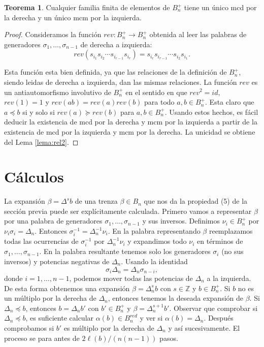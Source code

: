 \documentclass[12pt]{book}
\theoremstyle{definition}
\newtheorem{teor}{Teorema}[section]
\begin{document}
\begin{teor}
Cualquier familia finita de elementos de $B_n^+$ tiene un único mcd por la derecha y un único mcm por la izquierda.
\end{teor}
\begin{proof} Consideramos la función $rev: B_n^+\rightarrow B_n^+$ obtenida al leer las palabras de generadores $\sigma_1,\ldots, \sigma_{n-1}$ de derecha a izquierda:
$$rev(s_{i_1}s_{i_2}\cdots s_{i_{r-1}}s_{i_r})=s_{i_r}s_{i_{r-1}}\cdots s_{i_{2}}s_{i_1}.$$

Esta función esta bien definida, ya que las relaciones de la definición de $B_n^+$, siendo leidas de derecha a izquierda, dan las mismas relaciones. La función $rev$ es un antiautomorfismo involutivo de $B_n^+$ en el sentido en que $rev^2=id$, $rev(1)=1$ y $rev(ab)=rev(a)rev(b)$ para todo $a,b\in B_n^+$. Esta claro que $a\preceq b$ si y solo si $rev(a)\succeq rev(b)$ para $a,b\in B_n^+$. Usando estos hechos, es fácil deducir la existencia de mcd por la derecha y mcm por la izquierda a partir de la existencia de mcd por la izquierda y mcm por la derecha. La unicidad se obtiene del Lema \ref{lema:rel2}.
\end{proof}

\section{Cálculos}

La expansión $\beta=\Delta^sb$ de una trenza $\beta\in B_n$ que nos da la propiedad (5) de la sección previa puede ser explícitamente calculada. Primero vamos a representar $\beta$ por una palabra de generadores $\sigma_1,\ldots,\sigma_{n-1}$ y sus inversos. Definimos $\nu_i\in B_n^+$ por $\nu_i\sigma_i=\Delta_n$. Entonces $\sigma_i^{-1}=\Delta_n^{-1}\nu_i$. En la palabra representando $\beta$ reemplazamos todas las ocurrencias de $\sigma_i^{-1}$ por $\Delta_n^{-1}\nu_i$ y expandimos todo $\nu_i$ en términos de $\sigma_1,\ldots,\sigma_{n-1}$. En la palabra resultante tenemos solo los generadores $\sigma_i$ (no sus inversos) y potencias negativas de $\Delta_n$. Usando la identidad
\begin{equation}
\sigma_i\Delta_n=\Delta_n\sigma_{n-i},
\end{equation}
donde $i=1,\ldots,n-1$, podemos mover todas las potencias de $\Delta_n$ a la izquierda. De esta forma obtenemos una expansión $\beta=\Delta_n^sb$ con $s\in\mathbb{Z}$ y $b\in B_n^+$. Si $b$ no es un múltiplo por la derecha de $\Delta_n$, entonces tenemos la deseada expansión de $\beta$. Si $\Delta_n\preceq b$, entonces $b=\Delta_n b'$ con $b'\in B_n^+$ y $\beta=\Delta_n^{s+1}b'$. Observar que comprobar si $\Delta_n\preceq b$, es suficiente calcular $\alpha(b)\in B_n^{red}$ y ver si $\alpha(b)=\Delta_n$. Después comprobamos si $b'$ es múltiplo por la derecha de $\Delta_n$ y así sucesivamente. El proceso se para antes de $2\ell(b)/(n(n-1))$ pasos.
\end{document}
